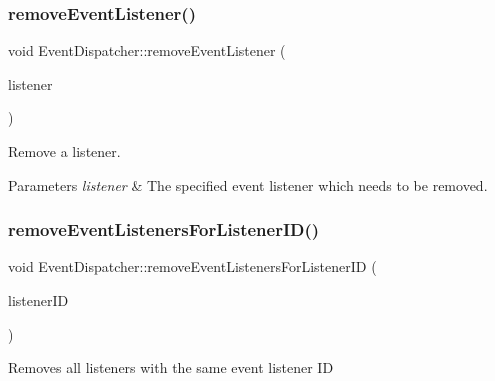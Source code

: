 \subsubsection{\texorpdfstring{remove\+Event\+Listener()}{removeEventListener()}\hspace{0.1cm}{\footnotesize\ttfamily [2/2]}}
{\footnotesize\ttfamily void Event\+Dispatcher\+::remove\+Event\+Listener (\begin{DoxyParamCaption}\item[{\hyperlink{classEventListener}{Event\+Listener} $\ast$}]{listener }\end{DoxyParamCaption})}

Remove a listener.


\begin{DoxyParams}{Parameters}
{\em listener} & The specified event listener which needs to be removed. \\
\hline
\end{DoxyParams}
\mbox{\label{classEventDispatcher_a456c75992716910637994a70ee65a37e}} 
\subsubsection{\texorpdfstring{remove\+Event\+Listeners\+For\+Listener\+I\+D()}{removeEventListenersForListenerID()}\hspace{0.1cm}{\footnotesize\ttfamily [1/2]}}
{\footnotesize\ttfamily void Event\+Dispatcher\+::remove\+Event\+Listeners\+For\+Listener\+ID (\begin{DoxyParamCaption}\item[{const Event\+Listener\+::\+Listener\+ID \&}]{listener\+ID }\end{DoxyParamCaption})\hspace{0.3cm}{\ttfamily [protected]}}

Removes all listeners with the same event listener ID \mbox{\label{classEventDispatcher_a456c75992716910637994a70ee65a37e}} 
